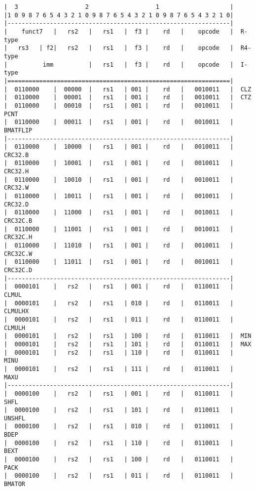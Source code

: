 \begin{minipage}{\linewidth}
\begin{verbatim}
|  3                   2                   1                    |
|1 0 9 8 7 6 5 4 3 2 1 0 9 8 7 6 5 4 3 2 1 0 9 8 7 6 5 4 3 2 1 0|
|---------------------------------------------------------------|
|    funct7   |   rs2   |   rs1   |  f3 |    rd   |    opcode   |  R-type
|   rs3   | f2|   rs2   |   rs1   |  f3 |    rd   |    opcode   |  R4-type
|          imm          |   rs1   |  f3 |    rd   |    opcode   |  I-type
|===============================================================|
|  0110000    |  00000  |   rs1   | 001 |    rd   |   0010011   |  CLZ
|  0110000    |  00001  |   rs1   | 001 |    rd   |   0010011   |  CTZ
|  0110000    |  00010  |   rs1   | 001 |    rd   |   0010011   |  PCNT
|  0110000    |  00011  |   rs1   | 001 |    rd   |   0010011   |  BMATFLIP
|---------------------------------------------------------------|
|  0110000    |  10000  |   rs1   | 001 |    rd   |   0010011   |  CRC32.B
|  0110000    |  10001  |   rs1   | 001 |    rd   |   0010011   |  CRC32.H
|  0110000    |  10010  |   rs1   | 001 |    rd   |   0010011   |  CRC32.W
|  0110000    |  10011  |   rs1   | 001 |    rd   |   0010011   |  CRC32.D
|  0110000    |  11000  |   rs1   | 001 |    rd   |   0010011   |  CRC32C.B
|  0110000    |  11001  |   rs1   | 001 |    rd   |   0010011   |  CRC32C.H
|  0110000    |  11010  |   rs1   | 001 |    rd   |   0010011   |  CRC32C.W
|  0110000    |  11011  |   rs1   | 001 |    rd   |   0010011   |  CRC32C.D
|---------------------------------------------------------------|
|  0000101    |   rs2   |   rs1   | 001 |    rd   |   0110011   |  CLMUL
|  0000101    |   rs2   |   rs1   | 010 |    rd   |   0110011   |  CLMULHX
|  0000101    |   rs2   |   rs1   | 011 |    rd   |   0110011   |  CLMULH
|  0000101    |   rs2   |   rs1   | 100 |    rd   |   0110011   |  MIN
|  0000101    |   rs2   |   rs1   | 101 |    rd   |   0110011   |  MAX
|  0000101    |   rs2   |   rs1   | 110 |    rd   |   0110011   |  MINU
|  0000101    |   rs2   |   rs1   | 111 |    rd   |   0110011   |  MAXU
|---------------------------------------------------------------|
|  0000100    |   rs2   |   rs1   | 001 |    rd   |   0110011   |  SHFL
|  0000100    |   rs2   |   rs1   | 101 |    rd   |   0110011   |  UNSHFL
|  0000100    |   rs2   |   rs1   | 010 |    rd   |   0110011   |  BDEP
|  0000100    |   rs2   |   rs1   | 110 |    rd   |   0110011   |  BEXT
|  0000100    |   rs2   |   rs1   | 100 |    rd   |   0110011   |  PACK
|  0000100    |   rs2   |   rs1   | 011 |    rd   |   0110011   |  BMATOR

\end{verbatim}
\end{minipage}
